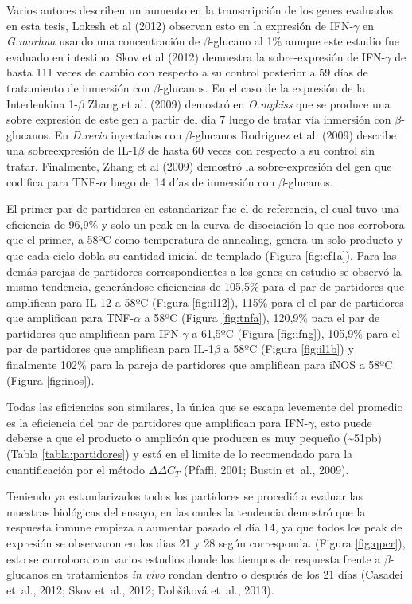 \documentclass[12pt,letterpaper,oneside]{scrbook}
\begin{document}
Varios autores describen un aumento en la transcripción de los genes
evaluados en esta tesis, Lokesh et al (2012) observan esto en la
expresión de IFN-\(\gamma\) en \emph{G.morhua} usando una concentración
de \(\beta\)-glucano al 1\% aunque este estudio fue evaluado en
intestino. Skov et al (2012) demuestra la sobre-expresión de
IFN-\(\gamma\) de hasta 111 veces de cambio con respecto a su control
posterior a 59 días de tratamiento de inmersión con \(\beta\)-glucanos.
En el caso de la expresión de la Interleukina 1-\(\beta\) Zhang et al.
(2009) demostró en \emph{O.mykiss} que se produce una sobre expresión de
este gen a partir del dia 7 luego de tratar vía inmersión con
\(\beta\)-glucanos. En \emph{D.rerio} inyectados con \(\beta\)-glucanos
Rodriguez et al. (2009) describe una sobreexpresión de IL-1\(\beta\) de
hasta 60 veces con respecto a su control sin tratar. Finalmente, Zhang
et al (2009) demostró la sobre-expresión del gen que codifica para
TNF-\(\alpha\) luego de 14 días de inmersión con \(\beta\)-glucanos.

El primer par de partidores en estandarizar fue el de referencia, el
cual tuvo una eficiencia de 96,9\% y solo un peak en la curva de
disociación lo que nos corrobora que el primer, a 58ºC como temperatura
de annealing, genera un solo producto y que cada ciclo dobla su cantidad
inicial de templado (Figura \ref{fig:ef1a}). Para las demás parejas de
partidores correspondientes a los genes en estudio se observó la misma
tendencia, generándose eficiencias de 105,5\% para el par de partidores
que amplifican para IL-12 a 58ºC (Figura \ref{fig:il12}), 115\% para el
el par de partidores que amplifican para TNF-\(\alpha\) a 58ºC (Figura
\ref{fig:tnfa}), 120,9\% para el par de partidores que amplifican para
IFN-\(\gamma\) a 61,5ºC (Figura \ref{fig:ifng}), 105,9\% para el par de
partidores que amplifican para IL-1\(\beta\) a 58ºC (Figura
\ref{fig:il1b}) y finalmente 102\% para la pareja de partidores que
amplifican para iNOS a 58ºC (Figura \ref{fig:inos}).

Todas las eficiencias son similares, la única que se escapa levemente
del promedio es la eficiencia del par de partidores que amplifican para
IFN-\(\gamma\), esto puede deberse a que el producto o amplicón que
producen es muy pequeño (\textasciitilde{}51pb) (Tabla
\ref{tabla:partidores}) y está en el limite de lo recomendado para la
cuantificación por el método \(\Delta\Delta C_T\) (Pfaffl, 2001; Bustin
et~al., 2009).

Teniendo ya estandarizados todos los partidores se procedió a evaluar
las muestras biológicas del ensayo, en las cuales la tendencia demostró
que la respuesta inmune empieza a aumentar pasado el día 14, ya que
todos los peak de expresión se observaron en los días 21 y 28 según
corresponda. (Figura \ref{fig:qpcr}), esto se corrobora con varios
estudios donde los tiempos de respuesta frente a \(\beta\)-glucanos en
tratamientos \emph{in vivo} rondan dentro o después de los 21 días
(Casadei et~al., 2012; Skov et~al., 2012; Dobšíková et~al., 2013).
\end{document}
